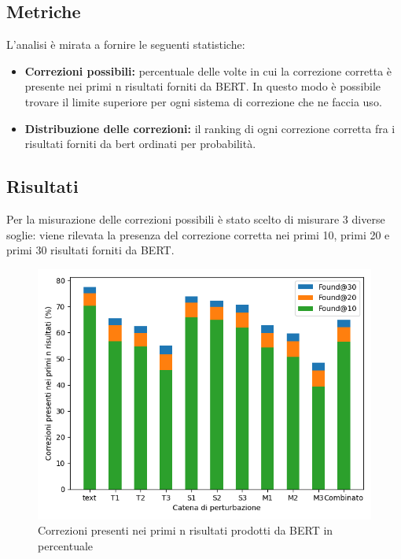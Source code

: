 \documentclass[12pt]{article}
\begin{document}
\subsection{Metriche}
L'analisi è mirata a fornire le seguenti statistiche:
\begin{itemize}
\item \textbf{Correzioni possibili:} percentuale delle volte in cui la correzione corretta è presente nei primi n risultati forniti da BERT. In questo modo è possibile trovare il limite superiore per ogni sistema di correzione che ne faccia uso.
\item \textbf{Distribuzione delle correzioni:} il ranking di ogni correzione corretta fra i risultati forniti da bert ordinati per probabilità.
\end{itemize}

\subsection{Risultati}
Per la misurazione delle correzioni possibili è stato scelto di misurare 3 diverse soglie: viene rilevata la presenza del correzione corretta nei primi 10, primi 20 e primi 30 risultati forniti da BERT.


\begin{figure}[H]
\centering
\includegraphics[width=\textwidth]{distributions/overview.png}
\caption{Correzioni presenti nei primi n risultati prodotti da BERT in percentuale}
\end{figure}


\end{document}
